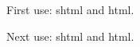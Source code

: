 \documentclass{article}
\begin{document}
First use: \gls{shtml} and \gls{html}.

Next use: \gls{shtml} and \gls{html}.

\printglossaries
\end{document}
